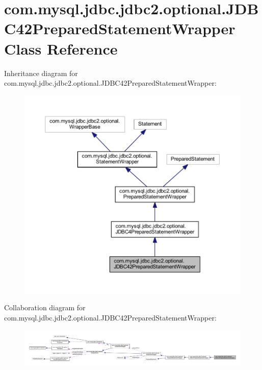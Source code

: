 \hypertarget{classcom_1_1mysql_1_1jdbc_1_1jdbc2_1_1optional_1_1_j_d_b_c42_prepared_statement_wrapper}{}\section{com.\+mysql.\+jdbc.\+jdbc2.\+optional.\+J\+D\+B\+C42\+Prepared\+Statement\+Wrapper Class Reference}
\label{classcom_1_1mysql_1_1jdbc_1_1jdbc2_1_1optional_1_1_j_d_b_c42_prepared_statement_wrapper}


Inheritance diagram for com.\+mysql.\+jdbc.\+jdbc2.\+optional.\+J\+D\+B\+C42\+Prepared\+Statement\+Wrapper\+:
\nopagebreak
\begin{figure}[H]
\begin{center}
\leavevmode
\includegraphics[width=350pt]{classcom_1_1mysql_1_1jdbc_1_1jdbc2_1_1optional_1_1_j_d_b_c42_prepared_statement_wrapper__inherit__graph}
\end{center}
\end{figure}


Collaboration diagram for com.\+mysql.\+jdbc.\+jdbc2.\+optional.\+J\+D\+B\+C42\+Prepared\+Statement\+Wrapper\+:
\nopagebreak
\begin{figure}[H]
\begin{center}
\leavevmode
\includegraphics[width=350pt]{classcom_1_1mysql_1_1jdbc_1_1jdbc2_1_1optional_1_1_j_d_b_c42_prepared_statement_wrapper__coll__graph}
\end{center}
\end{figure}
